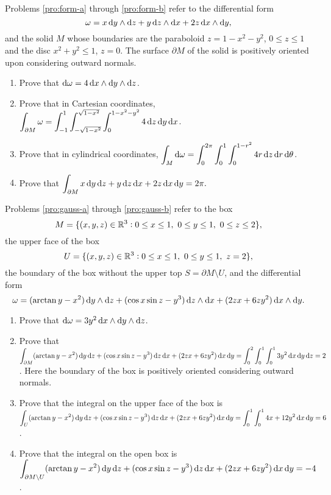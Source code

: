 \begin{problem}
Problems \ref{pro:form-a} through \ref{pro:form-b} refer to the
differential form $$ \omega = x\d{y}\wedge
\d{z}+y\d{z}\wedge\d{x}+2z\d{x}\wedge \d{y}, $$ and the solid $M$
whose boundaries are the paraboloid $z=1-x^2-y^2$, $0 \leq z \leq 1$
and the disc $x^2+y^2\leq 1$, $z=0$. The surface $\partial M$ of the
solid is positively oriented upon considering  outward normals.
\begin{enumerate}
\item \label{pro:form-a}  Prove that $\d{\omega}=4 \d{x}\wedge\d{y}\wedge\d{z}$.
\item Prove that in Cartesian coordinates, $\dint _{\partial M}\omega =\dint _{-1} ^1  \dint _{-\sqrt{1-x^2}}
^{\sqrt{1-x^2}} \dint _{0} ^{1-x^2-y^2} 4\d{z}\d{y}\d{x}$.
\item Prove that in cylindrical coordinates, $\dint _{M}\d{\omega}=\dint _0 ^{2\pi}\dint
_0 ^1 \dint _0 ^{1-r^2} 4r\d{z}\d{r}\d{\theta} $.
\item  \label{pro:form-b} Prove that $ \dint _{\partial M} x\d{y}\d{z}+y\d{z}\d{x}+2z\d{x}\d{y} =2\pi. $
\end{enumerate}
\end{problem}

\begin{problem}
Problems \ref{pro:gauss-a} through \ref{pro:gauss-b} refer to the
box
$$M=\{(x,y,z)\in\mathbb{R}^3: 0 \leq x \leq 1, \ 0 \leq y \leq 1, \ 0 \leq z \leq 2 \},  $$
the upper face of the box
$$U=\{(x,y,z)\in\mathbb{R}^3: 0 \leq x \leq 1, \ 0 \leq y \leq 1, \ z=2 \},  $$
the boundary of the box without the upper top $S=\partial M\setminus
U$,
 and the differential form
$$ \omega = (\arctan y-x^2)\d{y}\wedge\d{z} + (\cos x\sin z-y^3)\d{z}\wedge\d{x} + (2zx+6zy^2)\d{x}\wedge\d{y}. $$


\begin{enumerate}
\item  \label{pro:gauss-a} Prove that
$\d{\omega}=3y^2\d{x}\wedge\d{y}\wedge\d{z}$.
\item Prove that $\dint _{\partial M} (\arctan y-x^2)\d{y}\d{z} + (\cos x\sin z-y^3)\d{z}\d{x} + (2zx+6zy^2)\d{x}\d{y}
=\dint _0 ^2 \dint _0 ^1 \dint _0 ^1 3y^2\d{x}\d{y}\d{z}=2$. Here
the boundary of the box is positively oriented considering outward
normals.
\item Prove that the integral on the
upper face of the box is $\dint _{U} (\arctan y-x^2)\d{y}\d{z} +
(\cos x\sin z-y^3)\d{z}\d{x} + (2zx+6zy^2)\d{x}\d{y}=\dint _0 ^1
\dint _0 ^1 4x+12y^2\d{x}\d{y}=6$.
\item  \label{pro:gauss-b} Prove that the integral on the open box is $\dint _{\partial M\setminus U} (\arctan y-x^2)\d{y}\d{z} + (\cos
x\sin z-y^3)\d{z}\d{x} + (2zx+6zy^2)\d{x}\d{y}=-4$.
\end{enumerate}
\end{problem}

